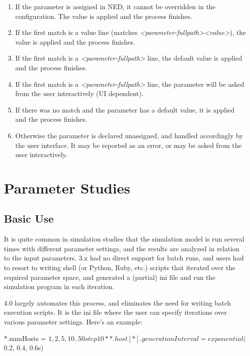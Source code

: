 \begin{enumerate}
\item If the parameter is assigned in NED, it cannot be overridden in the
    configuration. The value is applied and the process finishes.
\item If the first match is a value line (matches
    \textit{<parameter-fullpath>}\ttt{=}\textit{<value>}), the value is
    applied and the process finishes.
\item If the first match is a \textit{<parameter-fullpath>} line,
    the default value is applied and the process finishes.
\item If the first match is a \textit{<parameter-fullpath>} line,
    the parameter will be asked from the user interactively (UI dependent).
\item If there was no match and the parameter has a default value, it is applied
    and the process finishes.
\item Otherwise the parameter is declared unassigned, and handled accordingly
    by the user interface. It may be reported as an error, or may be
    asked from the user interactively.
\end{enumerate}


\section{Parameter Studies}

\subsection{Basic Use}


It is quite common in simulation studies that the simulation model is
run several times with different parameter settings, and the results
are analyzed in relation to the input parameters. {\opp} 3.x had no
direct support for batch runs, and users had to resort to writing shell
(or Python, Ruby, etc.) scripts that iterated over the required
parameter space, and generated a (partial) ini file and run the
simulation program in each iteration.

{\opp} 4.0 largely automates this process, and eliminates the need for
writing batch execution scripts. It is the ini file where the user can
specify iterations over various parameter settings.
Here's an example:

\begin{inifile}
*.numHosts = ${1, 2, 5, 10..50 step 10}
**.host[*].generationInterval = exponential(${0.2, 0.4, 0.6}s)
\end{inifile}


